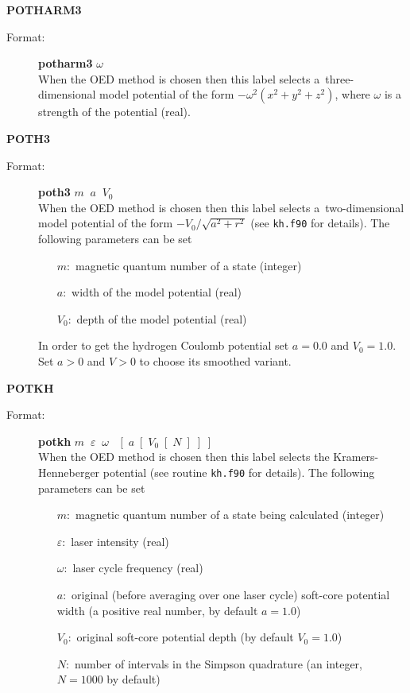 \documentclass[12pt,a4paper]{article}
\newcommand{\ft}[1]{\texttt{#1}}
\begin{document}
\begin{description}
\item \textbf{POTHARM3}
\begin{description}
\item[Format:] \textbf{potharm3} $\omega$ \\ When the OED method is chosen then this label
  selects a~three-dimensional model potential of the form $-\omega^2(x^2+y^2+z^2)$, where
  $\omega$ is a strength of the potential (real).
\end{description}



\item \textbf{POTH3}
\begin{description}
\item[Format:] \textbf{poth3} $m\;\;a\;\;V_0$ \\ When the OED method
  is chosen then this label selects a~two-dimensional model potential
  of the form $ -V_0/\sqrt{a^2+r^2}$ (see \ft{kh.f90} for
  details). The following parameters can be set

\begin{itemize}
\item [$m:$] magnetic quantum number of a state (integer)
\item [$a:$] width of the model potential (real)
\item [$V_0:$] depth of the model potential (real)
\end{itemize}
In order to get the hydrogen Coulomb potential set $a=0.0$ and
$V_0=1.0$. Set $a>0$ and $V>0$ to choose its smoothed variant.

\end{description}


\item \textbf{POTKH}
\begin{description}
\item[Format:] \textbf{potkh}
  $m\;\;\varepsilon\;\;\omega\;\;\;[\;a\;[\;V_0\;[\;N\;]\;]\;]$
  \\ When the OED method is chosen then this label selects the
  Kramers-Henneberger potential (see routine \ft{kh.f90} for
  details). The following parameters can be set
\begin{itemize}
\item [$m:$] magnetic quantum number of a state being calculated (integer)
\item [$\varepsilon:$] laser intensity (real)
\item [$\omega:$] laser cycle frequency (real)
\item [$a:$] original (before averaging over one laser cycle)
  soft-core potential width (a positive real number, by default $a=1.0$)
\item [$V_0:$] original soft-core potential depth (by default $V_0=1.0$)
\item [$N:$] number of intervals in the Simpson quadrature (an
  integer, $N=1000$ by default)
\end{itemize}
\end{description}



\end{description}
\end{document}
